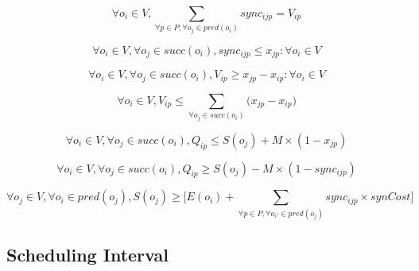 \begin{equation}
\forall o_i \in V, \sum_{\forall p \in P, \forall o_j \in pred(o_i)}sync_{ijp}= V_{ip}
\label{schedRT:const_3}
\end{equation}

\begin{equation}
\forall o_i \in V, \forall o_j \in succ(o_i), sync_{ijp} \leq x_{jp}: \forall o_i \in V
\label{schedRT:const_4}
\end{equation}

\begin{equation}
\forall o_i \in V, \forall o_j \in succ(o_i), V_{ip} \geq x_{jp} - x_{ip}: \forall o_i \in V
\label{schedRT:const_5}
\end{equation}

\begin{equation}
 \forall o_i \in V, V_{ip} \leq \sum_{\forall o_j \in succ(o_i)}\big(x_{jp} - x_{ip}\big)
\label{schedRT:const_6}
\end{equation}

\begin{equation}
\forall o_i \in V, \forall o_j \in succ(o_i), Q_{ip} \leq S(o_j) + M \times (1-x_{jp})
\label{schedRT:const_7}
\end{equation}

\begin{equation}
\forall o_i \in V, \forall o_j \in succ(o_i), Q_{ip} \geq S(o_j) - M \times (1-sync_{ijp})
\label{schedRT:const_8}
\end{equation} 

\begin{equation}
\forall o_j \in V, \forall o_i \in pred(o_j), S(o_j) \geq \Big[E(o_i) + \sum_{\forall p \in P, \forall o_{i'} \in pred(o_j)}sync_{ijp}\times synCost\Big]
\label{schedRT:const_9}
\end{equation}

\subsection{Scheduling Interval}

